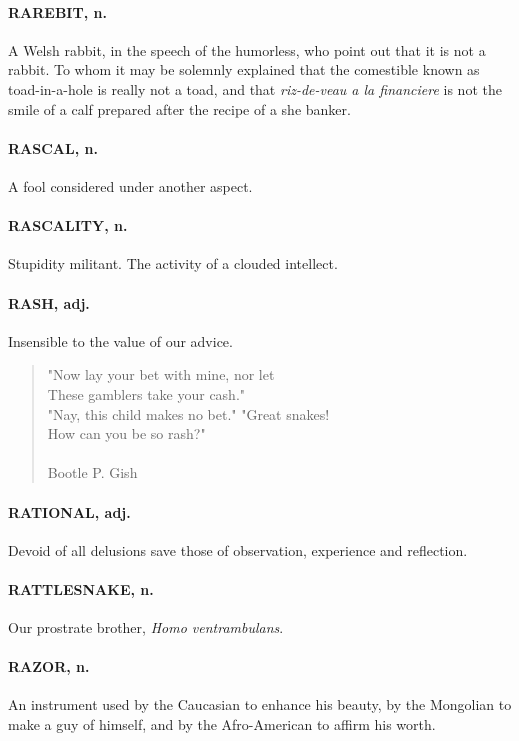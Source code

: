 \documentclass[11pt]{article}
\begin{document}
\paragraph{RAREBIT, n.}  A Welsh rabbit, in the speech of the humorless, who point
out that it is not a rabbit.  To whom it may be solemnly explained
that the comestible known as toad-in-a-hole is really not a toad, and
that {\em riz-de-veau a la financiere} is not the smile of a calf prepared
after the recipe of a she banker.

\paragraph{RASCAL, n.}  A fool considered under another aspect.

\paragraph{RASCALITY, n.}  Stupidity militant.  The activity of a clouded
intellect.

\paragraph{RASH, adj.}  Insensible to the value of our advice.

\begin{quote}   "Now lay your bet with mine, nor let \\
      These gamblers take your cash." \\
  "Nay, this child makes no bet."  "Great snakes! \\
      How can you be so rash?" \\
 \\
Bootle P. Gish \end{quote}


\paragraph{RATIONAL, adj.}  Devoid of all delusions save those of observation,
experience and reflection.

\paragraph{RATTLESNAKE, n.}  Our prostrate brother, {\em Homo ventrambulans}.

\paragraph{RAZOR, n.}  An instrument used by the Caucasian to enhance his beauty,
by the Mongolian to make a guy of himself, and by the Afro-American to
affirm his worth.
\end{document}
